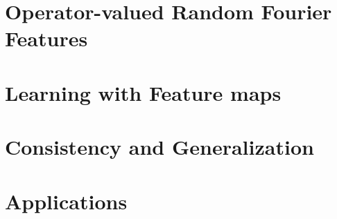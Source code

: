 \chapter{Operator-valued Random Fourier Features}
\label{ch:operator-valued_random_fourier_features}


\chapter{Learning with Feature maps}
\label{ch:learning operator-valued_random_fourier_features}


\chapter{Consistency and Generalization} %
\label{ch:concistency_and_generalization}


\chapter{Applications} %
\label{ch:applications}


